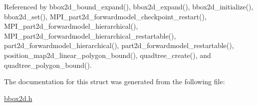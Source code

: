 Referenced by bbox2d\+\_\+bound\+\_\+expand(), bbox2d\+\_\+expand(), bbox2d\+\_\+initialize(), bbox2d\+\_\+set(), M\+P\+I\+\_\+part2d\+\_\+forwardmodel\+\_\+checkpoint\+\_\+restart(), M\+P\+I\+\_\+part2d\+\_\+forwardmodel\+\_\+hierarchical(), M\+P\+I\+\_\+part2d\+\_\+forwardmodel\+\_\+hierarchical\+\_\+restartable(), part2d\+\_\+forwardmodel\+\_\+hierarchical(), part2d\+\_\+forwardmodel\+\_\+restartable(), position\+\_\+map2d\+\_\+linear\+\_\+polygon\+\_\+bound(), quadtree\+\_\+create(), and quadtree\+\_\+polygon\+\_\+bound().



The documentation for this struct was generated from the following file\+:\begin{DoxyCompactItemize}
\item 
\hyperlink{bbox2d_8h}{bbox2d.\+h}\end{DoxyCompactItemize}
